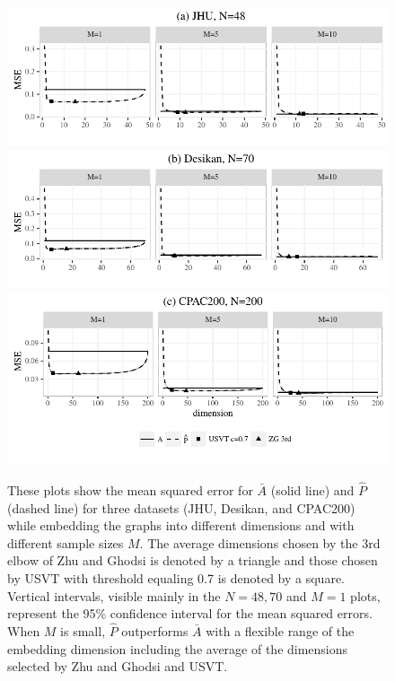 \documentclass[journal,twoside,web]{ieeecolor}
\begin{document}
\begin{figure}[!htbp]
\centering
\includegraphics[width=.99\linewidth]{corr_data_MSE_jhu.pdf}\\
\includegraphics[width=.99\linewidth]{corr_data_MSE_desikan.pdf}\\
\includegraphics[width=.99\linewidth]{corr_data_MSE_CPAC200.pdf}
\caption{
These plots show the mean squared error for $\bar{A}$ (solid line) and $\hat{P}$ (dashed line) for three datasets (JHU, Desikan, and CPAC200) while embedding the graphs into different dimensions and with different sample sizes $M$. The average dimensions chosen by the 3rd elbow of Zhu and Ghodsi is denoted by a triangle
 and those chosen by USVT with threshold equaling 0.7 is denoted by a square.
 Vertical intervals, visible mainly in the $N=48,70$ and $M=1$ plots, represent the 95\% confidence interval for the mean squared errors.  When $M$ is small, $\hat{P}$ outperforms $\bar{A}$ with a flexible range of the embedding dimension including the average of the dimensions selected by Zhu and Ghodsi and USVT.}
\label{fig:realdata}
\end{figure}
\end{document}
